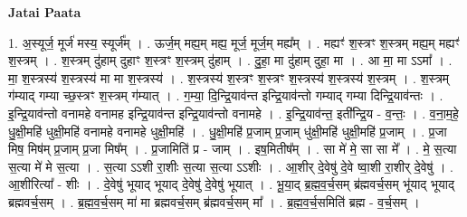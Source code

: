 \documentclass[17pt]{extarticle}
\begin{document}
\textbf{Jatai Paata} \newline

1. अ॒स्यूर्ज॒ मूर्ज॑ मस्य॒ स्यूर्ज᳚म् । . ऊर्ज॒म् मह्य॒म् मह्य॒ मूर्ज॒ मूर्ज॒म् मह्य᳚म् । . मह्यꣳ॑ श॒स्त्रꣳ श॒स्त्रम् मह्य॒म् मह्यꣳ॑ श॒स्त्रम् । . श॒स्त्रम् दु॑हाम् दुहाꣳ श॒स्त्रꣳ श॒स्त्रम् दु॑हाम् । . दु॒हा॒ मा दु॑हाम् दुहा॒ मा । . आ मा॒ मा ऽऽमा᳚ । . मा॒ श॒स्त्रस्य॑ श॒स्त्रस्य॑ मा मा श॒स्त्रस्य॑ । . श॒स्त्रस्य॑ श॒स्त्रꣳ श॒स्त्रꣳ श॒स्त्रस्य॑ श॒स्त्रस्य॑ श॒स्त्रम् । . श॒स्त्रम् ग॑म्याद् गम्या च्छ॒स्त्रꣳ श॒स्त्रम् ग॑म्यात् । . ग॒म्या॒ दि॒न्द्रि॒याव॑न्त इन्द्रि॒याव॑न्तो गम्याद् गम्या दिन्द्रि॒याव॑न्तः । . इ॒न्द्रि॒याव॑न्तो वनामहे वनामह इन्द्रि॒याव॑न्त इन्द्रि॒याव॑न्तो वनामहे । . इ॒न्द्रि॒याव॑न्त॒ इती᳚न्द्रि॒य - व॒न्तः॒ । . व॒ना॒म॒हे॒ धु॒क्षी॒महि॑ धुक्षी॒महि॑ वनामहे वनामहे धुक्षी॒महि॑ । . धु॒क्षी॒महि॑ प्र॒जाम् प्र॒जाम् धु॑क्षी॒महि॑ धुक्षी॒महि॑ प्र॒जाम् । . प्र॒जा मिष॒ मिष॑म् प्र॒जाम् प्र॒जा मिष᳚म् । . प्र॒जामिति॑ प्र - जाम् । . इष॒मितीष᳚म् । . सा मे॑ मे॒ सा सा मे᳚ । . मे॒ स॒त्या स॒त्या मे॑ मे स॒त्या । . स॒त्या ऽऽशी रा॒शीः स॒त्या स॒त्या ऽऽशीः । . आ॒शीर् दे॒वेषु॑ दे॒वे ष्वा॒शी रा॒शीर् दे॒वेषु॑ । . आ॒शीरित्या᳚ - शीः । . दे॒वेषु॑ भूयाद् भूयाद् दे॒वेषु॑ दे॒वेषु॑ भूयात् । . भू॒या॒द् ब्र॒ह्म॒व॒र्च॒सम् ब्र॑ह्मवर्च॒सम् भू॑याद् भूयाद् ब्रह्मवर्च॒सम् । . ब्र॒ह्म॒व॒र्च॒सम् मा॑ मा ब्रह्मवर्च॒सम् ब्र॑ह्मवर्च॒सम् मा᳚ । . ब्र॒ह्म॒व॒र्च॒समिति॑ ब्रह्म - व॒र्च॒सम् । \newline
\end{document}
